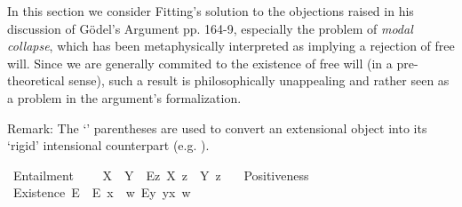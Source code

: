 %
\begin{isabellebody}%
%
%
%
%
%
%
%
%
\isamarkuptrue%
%
\begin{isamarkuptext}%
In this section we consider Fitting's solution to the objections raised in his discussion of G\"odel's Argument pp. 164-9, 
especially the problem of \emph{modal collapse}, which has been metaphysically interpreted as implying a rejection of free will.
Since we are generally commited to the existence of free will (in a pre-theoretical sense), such a result is
philosophically unappealing and rather seen as a problem in the argument's formalization.%
\end{isamarkuptext}\isamarkuptrue%
%
\begin{isamarkuptext}%
Remark: The `\isa{{\isasymlparr}{\isacharunderscore}{\isasymrparr}}' parentheses are used to convert an extensional object into its `rigid'
intensional counterpart (e.g. ).%
\end{isamarkuptext}\isamarkuptrue%
\isamarkupfalse%
\ Entailment{\isacharcolon}{\isacharcolon}{\isachardoublequoteopen}{\isasymup}{\isasymlangle}{\isasymlangle}{\isasymzero}{\isasymrangle}{\isacharcomma}{\isasymlangle}{\isasymzero}{\isasymrangle}{\isasymrangle}{\isachardoublequoteclose}\ {\isacharparenleft}\isanewline
\ \ \ {\isachardoublequoteopen}X\ {\isasymRrightarrow}\ Y\ {\isasymequiv}\ \isactrlbold {\isasymbox}{\isacharparenleft}\isactrlbold {\isasymforall}\isactrlsup Ez{\isachardot}\ {\isasymlparr}X\ z{\isasymrparr}\ \isactrlbold {\isasymrightarrow}\ {\isasymlparr}Y\ z{\isasymrparr}{\isacharparenright}{\isachardoublequoteclose}\ \ \isanewline
{}\isamarkupfalse%
\ Positiveness{\isacharcolon}{\isacharcolon}{\isachardoublequoteopen}{\isasymup}{\isasymlangle}{\isasymlangle}{\isasymzero}{\isasymrangle}{\isasymrangle}{\isachardoublequoteclose}\ {\isacharparenleft}{\isachardoublequoteopen}{\isasymP}{\isachardoublequoteclose}{\isacharparenright}\isanewline
{}\isamarkupfalse%
\ Existence{\isacharcolon}{\isacharcolon}{\isachardoublequoteopen}{\isasymup}{\isasymlangle}{\isasymzero}{\isasymrangle}{\isachardoublequoteclose}\ {\isacharparenleft}{\isachardoublequoteopen}E{\isacharbang}{\isachardoublequoteclose}{\isacharparenright}\ \ {\isachardoublequoteopen}E{\isacharbang}\ x\ {\isasymequiv}\ {\isasymlambda}w{\isachardot}\ {\isacharparenleft}\isactrlbold {\isasymexists}\isactrlsup Ey{\isachardot}\ y\isactrlbold {\isasymapprox}x{\isacharparenright}\ w{\isachardoublequoteclose}\isanewline

\end{isabellebody}

